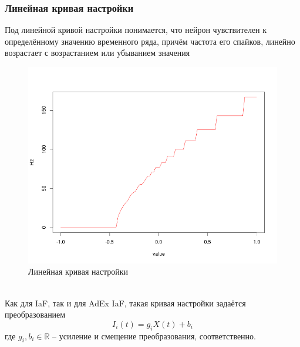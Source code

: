 \documentclass[a4paper,10pt,usenames]{article}
\begin{document}
\subsubsection{Линейная кривая настройки}
\indent Под линейной кривой настройки понимается, что нейрон чувствителен к определённому значению временного ряда, причём частота его спайков, линейно возрастает с возрастанием или убыванием значения
\begin{figure}[ht]
\centering
\captionsetup{justification=centering,margin=1cm}
\includegraphics[width=120mm,scale=1]{linear_curve.png}
\caption{Линейная кривая настройки}
\label{linear_curve}
\end{figure}\\
Как для IaF, так и для AdEx IaF, такая кривая настройки задаётся преобразованием
\begin{equation}
I_{i}(t) = g_{i}X(t) + b_{i}
\end{equation} 
где $g_{i}, b_{i} \in \mathbb{R}$ -- усиление и смещение преобразования, соответственно.\\
\end{document}
